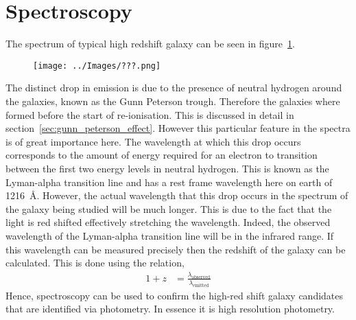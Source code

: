 \section{Spectroscopy} %
\label{sec:spectroscopy}
	The spectrum of typical high redshift galaxy can be seen in figure~\ref{fig:high_redshift_galaxy_spectrum}.
	\begin{figure}[!htb]
		\centering
			\texttt{[image: ../Images/???.png]}
		\caption{\label{fig:high_redshift_galaxy_spectrum}}
	\end{figure}

	The distinct drop in emission is due to the presence of neutral hydrogen around the galaxies, known as the Gunn Peterson trough. Therefore the galaxies where formed before the start of re-ionisation. This is discussed in detail in section~\ref{sec:gunn_peterson_effect}. However this particular feature in the spectra is of great importance here. The wavelength at which this drop occurs corresponds to the amount of energy required for an electron to transition between the first two energy levels in neutral hydrogen. This is known as the Lyman-alpha transition line and has a rest frame wavelength here on earth of \SI{1216}{\angstrom}. However, the actual wavelength that this drop occurs in the spectrum of the galaxy being studied will be much longer. This is due to the fact that the light is red shifted effectively stretching the wavelength. Indeed, the observed wavelength of the Lyman-alpha transition line will be in the infrared range. If this wavelength can be measured precisely then the redshift of the galaxy can be calculated. This is done using the relation,
	\begin{align}
		1+z &= \frac{\lambda_{\text{observed}}}{\lambda_{\text{emitted}}}
	\end{align}
	Hence, spectroscopy can be used to confirm the high-red shift galaxy candidates that are identified via photometry. In essence it is high resolution photometry.

